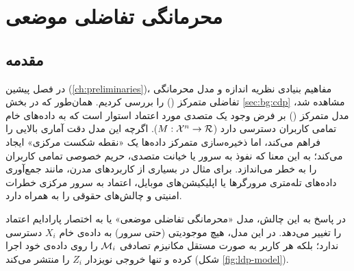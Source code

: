 \chapter{محرمانگی تفاضلی موضعی}
\label{ch:ldp}

\section{مقدمه}
در فصل پیشین (\ref{ch:preliminaries})، مفاهیم بنیادی نظریه اندازه و مدل محرمانگی تفاضلی متمرکز () را بررسی کردیم. همان‌طور که در بخش \ref{sec:bg:cdp} مشاهده شد، مدل متمرکز () بر فرض وجود یک متصدی مورد اعتماد استوار است که به داده‌های خام تمامی کاربران دسترسی دارد ($M: \Xset^n \to \Rset$).
اگرچه این مدل دقت آماری بالایی را فراهم می‌کند، اما ذخیره‌سازی متمرکز داده‌ها یک «نقطه شکست مرکزی» ایجاد می‌کند؛ به این معنا که نفوذ به سرور یا خیانت متصدی، حریم خصوصی تمامی کاربران را به خطر می‌اندازد.
برای مثال در بسیاری از کاربردهای مدرن، مانند جمع‌آوری داده‌های تله‌متری مرورگرها یا اپلیکیشن‌های موبایل، اعتماد به سرور مرکزی خطرات امنیتی و چالش‌های حقوقی را به همراه دارد.

در پاسخ به این چالش، مدل «محرمانگی تفاضلی موضعی» یا به اختصار  پارادایم اعتماد را تغییر می‌دهد. در این مدل، هیچ موجودیتی (حتی سرور) به داده‌ی خام $X_i$ دسترسی ندارد؛ بلکه هر کاربر به صورت مستقل مکانیزم تصادفی $\mech_i$ را روی داده‌ی خود اجرا کرده و تنها خروجی نویزدار $Z_i$ را منتشر می‌کند (شکل \ref{fig:ldp-model}).

